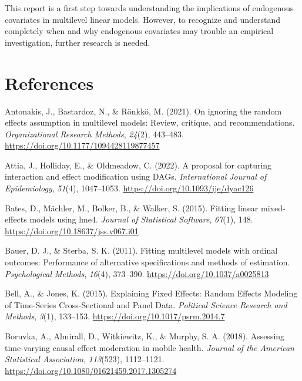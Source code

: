 \documentclass[
  11pt,
  a4paper,
]{article}
\newlength{\cslhangindent}
\newenvironment{CSLReferences}[2] %
 {\begin{list}{}{%
  \setlength{\itemindent}{0pt}
  \setlength{\leftmargin}{0pt}
  \setlength{\parsep}{0pt}
  \ifodd #1
   \setlength{\leftmargin}{\cslhangindent}
   \setlength{\itemindent}{-1\cslhangindent}
  \fi
  \setlength{\itemsep}{#2\baselineskip}}}
 {\end{list}}
\begin{document}
This report is a first step towards understanding the implications of
endogenous covariates in multilevel linear models. However, to recognize
and understand completely when and why endogenous covariates may trouble
an empirical investigation, further research is needed.

\newpage

\section{References}\label{references}

\label{refs}
\begin{CSLReferences}{1}{0}
Antonakis, J., Bastardoz, N., \& Rönkkö, M. (2021). On ignoring the
random effects assumption in multilevel models: Review, critique, and
recommendations. \emph{Organizational Research Methods}, \emph{24}(2),
443--483. \url{https://doi.org/10.1177/1094428119877457}

Attia, J., Holliday, E., \& Oldmeadow, C. (2022). A proposal for
capturing interaction and effect modification using DAGs.
\emph{International Journal of Epidemiology}, \emph{51}(4), 1047--1053.
\url{https://doi.org/10.1093/ije/dyac126}

Bates, D., Mächler, M., Bolker, B., \& Walker, S. (2015). Fitting linear
mixed-effects models using {lme4}. \emph{Journal of Statistical
Software}, \emph{67}(1), 148.
\url{https://doi.org/10.18637/jss.v067.i01}

Bauer, D. J., \& Sterba, S. K. (2011). Fitting multilevel models with
ordinal outcomes: Performance of alternative specifications and methods
of estimation. \emph{Psychological Methods}, \emph{16}(4), 373--390.
\url{https://doi.org/10.1037/a0025813}

Bell, A., \& Jones, K. (2015). Explaining Fixed Effects: Random Effects
Modeling of Time-Series Cross-Sectional and Panel Data. \emph{Political
Science Research and Methods}, \emph{3}(1), 133--153.
\url{https://doi.org/10.1017/psrm.2014.7}

Boruvka, A., Almirall, D., Witkiewitz, K., \& Murphy, S. A. (2018).
Assessing time-varying causal effect moderation in mobile health.
\emph{Journal of the American Statistical Association}, \emph{113}(523),
1112--1121. \url{https://doi.org/10.1080/01621459.2017.1305274}


\end{CSLReferences}
\end{document}
